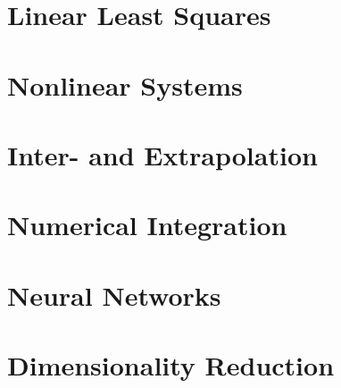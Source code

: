 \begin{multicols*}{4}

\section{Linear Least Squares}
    
    

\section{Nonlinear Systems}
    
    
    
    
\section{Inter- and Extrapolation}
    
    

\section{Numerical Integration}
    
    
    
    
    

\section{Neural Networks}
    
    
    
\section{Dimensionality Reduction}
    
\end{multicols*}     

